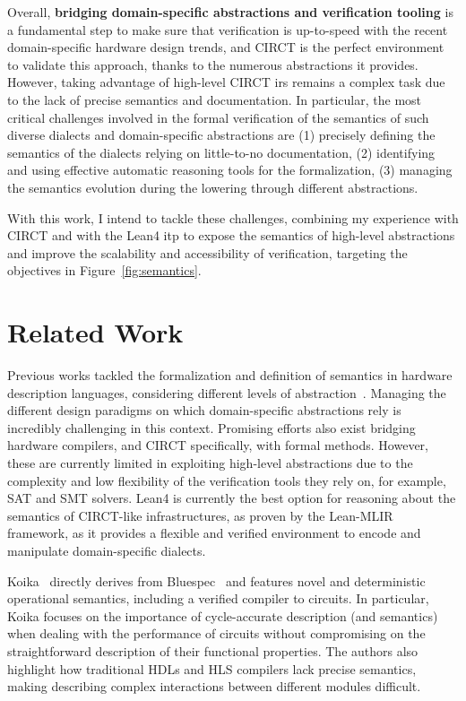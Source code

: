 \documentclass[sigconf,authorversion,nonacm, 11pt]{acmart}
\begin{document}
Overall, \textbf{bridging domain-specific abstractions and verification tooling} is a fundamental step to make sure that verification is up-to-speed with the recent domain-specific hardware design trends, and CIRCT is the perfect environment to validate this approach, thanks to the numerous abstractions it provides. 
However, taking advantage of high-level CIRCT \acp{ir} remains a complex task due to the lack of precise semantics and documentation. 
In particular, the most critical challenges involved in the formal verification of the semantics of such diverse dialects and domain-specific abstractions are 
(1) precisely defining the semantics of the dialects relying on little-to-no documentation, 
(2) identifying and using effective automatic reasoning tools for the formalization, 
(3) managing the semantics evolution during the lowering through different abstractions. 

With this work, I intend to tackle these challenges, combining my experience with CIRCT and with the Lean4 \ac{itp} to expose the semantics of high-level abstractions and improve the scalability and accessibility of verification, targeting the objectives in Figure~\ref{fig:semantics}. 

\section{Related Work}

Previous works tackled the formalization and definition of semantics in hardware description languages, considering different levels of abstraction~\cite{melham1988abstraction}. 
Managing the different design paradigms on which domain-specific abstractions rely is incredibly challenging in this context. 
Promising efforts also exist bridging hardware compilers, and CIRCT specifically, with formal methods. 
However, these are currently limited in exploiting high-level abstractions due to the complexity and low flexibility of the verification tools they rely on, for example, SAT and SMT solvers.
Lean4 is currently the best option for reasoning about the semantics of CIRCT-like infrastructures, as proven by the Lean-MLIR~\cite{bhat2024verifying} framework, as it provides a flexible and verified environment to encode and manipulate domain-specific dialects.

Koika~\cite{bourgeat2020essence} directly derives from Bluespec~\cite{bluespec} and features novel and deterministic operational semantics, including a verified compiler to circuits. 
In particular, Koika focuses on the importance of cycle-accurate description (and semantics) when dealing with the performance of circuits without compromising on the straightforward description of their functional properties. 
The authors also highlight how traditional HDLs and HLS compilers lack precise semantics, making describing complex interactions between different modules difficult.
\end{document}
